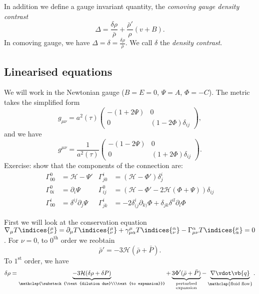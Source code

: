 \documentclass{jknotes}
\begin{document}
In addition we define a gauge invariant quantity, the \emph{comoving gauge density contrast}
\begin{equation}
    \Delta = \frac{\delta\rho}{\bar{\rho}} + \frac{\bar{\rho}'}{\rho}(v+B).
\end{equation}
In comoving gauge, we have \(\Delta = \delta = \frac{\delta\rho}{\bar{\rho}}\). We call \(\delta\) the \emph{density contrast}.

\subsection{Linearised equations}
We will work in the Newtonian gauge (\(B=E=0\), \(\Psi = A\), \(\Phi = -C\)). The metric takes the simplified form
\begin{equation}
    g_{\mu\nu} = a^2(\tau)
    \begin{pmatrix}
        -(1+2\Psi) & 0 \\
        0 & (1-2\Phi)\delta_{ij}
    \end{pmatrix},
\end{equation}
and we have
\begin{equation}
    g^{\mu\nu} = \frac{1}{a^2(\tau)}
    \begin{pmatrix}
        -(1-2\Psi) & 0 \\
        0 & (1+2\Phi)\delta_{ij}
    \end{pmatrix}.
\end{equation}
Exercise: show that the components of the connection are:
\begin{align}
    \Gamma^0_{00} &= \mathcal{H}-\Psi' & \Gamma^i_{j0} &= (\mathcal{H}-\Phi')\delta^i_j \\
    \Gamma^0_{0i} &= \partial_i\Psi & \Gamma^0_{ij} &= (\mathcal{H} - \Phi' -2\mathcal{H}(\Phi+\Psi))\delta_{ij} \\
    \Gamma^i_{00} &= \delta^{ij}\partial_j\Psi & \Gamma^i_{jk} &= -2\delta^i_{(j}\partial_{k)}\Phi + \delta_{jk}\delta^{il}\partial_l\Phi
\end{align}

First we will look at the conservation equation \(\nabla_\mu T\indices{^\mu_\nu}=\partial_\mu T\indices{^\mu_\nu} + \gamma^\mu_{\mu\alpha}T\indices{^\alpha_\nu} - \Gamma^\alpha_{\mu\nu}T\indices{^\mu_\alpha}=0\). For \(\nu = 0\), to \(0^{\mathrm{th}}\) order we reobtain
\begin{equation}
    \bar{\rho}'=-3\mathcal{H}(\bar{\rho}+\bar{P}).
\end{equation}
To \(1^{\mathrm{st}}\) order, we have
\begin{equation}
    \delta\rho = \underbrace{-3\mathcal{H}(\delta\rho+\delta P)}_{\mathclap{\substack{\text{dilution due}\\\text{to expansion}}}} + \underbrace{3\Phi'(\bar{\rho}+\bar{P})}_{\substack{\text{perturbed}\\\text{expansion}}} - \underbrace{\nabla\vdot\vb{q}}_{\mathclap{\text{fluid flow}}}.
\end{equation}
\end{document}
